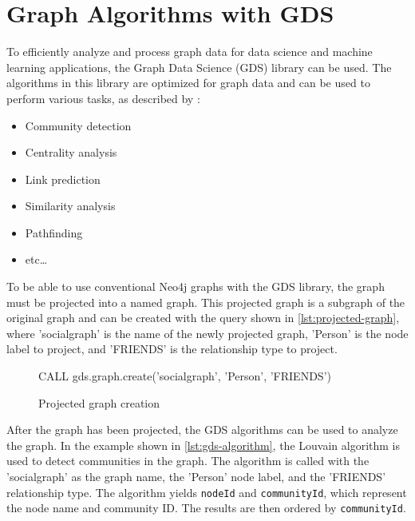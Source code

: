 \documentclass[english,smartquotes,apa]{hgbreport}
\begin{document}

\section*{Graph Algorithms with GDS}

To efficiently analyze and process graph data for data science and machine learning applications, the Graph Data Science (GDS) library can be used. The algorithms in this library are optimized for graph data and can be used to perform various tasks, as described by \cite{neo4j-gds}:

\begin{itemize}
	\item Community detection
	\item Centrality analysis
	\item Link prediction
	\item Similarity analysis
	\item Pathfinding
	\item etc\dots
\end{itemize}

To be able to use conventional Neo4j graphs with the GDS library, the graph must be projected into a named graph. This projected graph is a subgraph of the original graph and can be created with the query shown in \autoref{lst:projected-graph}, where 'socialgraph' is the name of the newly projected graph, 'Person' is the node label to project, and 'FRIENDS' is the relationship type to project.

\begin{figure}[h]
	\begin{GenericCode}[numbers=none]
	CALL gds.graph.create('socialgraph', 'Person', 'FRIENDS')
	\end{GenericCode}
	\caption{Projected graph creation}
	\label{lst:projected-graph}
\end{figure}

After the graph has been projected, the GDS algorithms can be used to analyze the graph. In the example shown in \autoref{lst:gds-algorithm}, 
the Louvain algorithm is used to detect communities in the graph. The algorithm is called with the 'socialgraph' as the graph name, the 'Person' node label, and the 'FRIENDS' relationship type. The algorithm yields \lstinline{nodeId} and \lstinline{communityId}, which represent the node name and community ID. The results are then ordered by \lstinline{communityId}.
\end{document}
